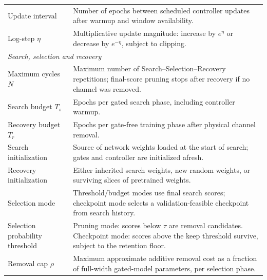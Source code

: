\begin{table}[!t]
\begin{tabular}{@{}p{}p{}@{}}
Update interval & Number of epochs between scheduled controller updates after warmup and window availability. \\
Log-step $\eta$ & Multiplicative update magnitude: increase by $e^{\eta}$ or decrease by $e^{-\eta}$, subject to clipping. \\
\midrule
\multicolumn{2}{l}{\textit{Search, selection and recovery}} \\
Maximum cycles $N$ & Maximum number of Search--Selection--Recovery repetitions; final-score pruning stops after recovery if no channel was removed. \\
Search budget $T_s$ & Epochs per gated search phase, including controller warmup. \\
Recovery budget $T_r$ & Epochs per gate-free training phase after physical channel removal. \\
Search initialization & Source of network weights loaded at the start of search; gates and controller are initialized afresh. \\
Recovery initialization & Either inherited search weights, new random weights, or surviving slices of pretrained weights. \\
Selection mode & Threshold/budget modes use final search scores; checkpoint mode selects a validation-feasible checkpoint from search history. \\
Selection probability threshold & Pruning mode: scores below $\tau$ are removal candidates. Checkpoint mode: scores above the keep threshold survive, subject to the retention floor. \\
Removal cap $\rho$ & Maximum approximate additive removal cost as a fraction of full-width gated-model parameters, per selection phase. \\
\bottomrule
\end{tabular}
\end{table}

